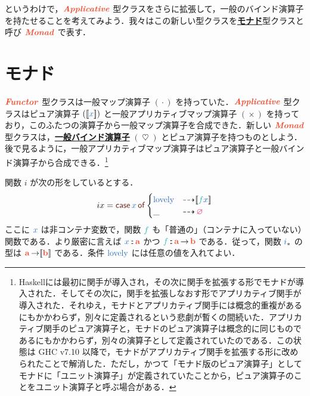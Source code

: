 \documentclass[a5paper,twoside,fleqn,draft]{jsbook}
\def\[{[\![}
\def\]{]\!]}
\def\constantColor{WildStrawberry}
\def\keywordColor{Sepia}
\def\varColor{NavyBlue}
\def\funcColor{BlueGreen}
\def\typeColor{RedOrange}
\newcommand{\programminglanguage}[1]{\textsf{#1}}
\newcommand{\haskell}{\programminglanguage{Haskell}}
\newcommand{\keyword}[1]{{\underline{\textbf{#1}}}}
\newcommand{\mKeyword}[1]{\textcolor{\keywordColor}{\mathsf{#1}}}
\newcommand{\mCaseKeyword}{\mKeyword{case}}
\newcommand{\mOfKeyword}{\mKeyword{of}}
\DeclareMathOperator{\mCaseKW}{\mCaseKeyword}
\DeclareMathOperator{\mOfKW}{\mOfKeyword}
\newcommand{\mPureNothing}{\textcolor{\constantColor}{\varnothing}}
\newcommand{\mVar}[1]{\textcolor{\varColor}{#1}}
\newcommand{\mSpecialVar}[1]{\textcolor{\varColor}{\textrm{#1}}}
\newcommand{\mLovelyVar}{\mSpecialVar{lovely}}
\newcommand{\mXVar}{\mVar{x}}
\newcommand{\mFunc}[1]{\textcolor{\funcColor}{#1}}
\newcommand{\mFFunc}{{\mFunc{f}}}
\DeclareMathOperator{\mAppMap}{\times}
\DeclareMathOperator{\mBind}{\heartsuit}
\DeclareMathOperator{\mBindMaybe}{\spadesuit}
\DeclareMathOperator{\mFuncArrow}{\rightarrow}
\DeclareMathOperator{\mIfSo}{\dashrightarrow}
\DeclareMathOperator{\mIn}{{:\!:}}
\DeclareMathOperator{\mMap}{\cdot}
\newcommand{\mType}[1]{\textcolor{\typeColor}{\mathbf{#1}}}
\newcommand{\mA}{\mType{a}}
\newcommand{\mB}{\mType{b}}
\newcommand{\mPureType}[1]{\[\mType{#1}\]}
\newcommand{\mPureWith}[1]{\[\mVar{#1}\]}
\newcommand{\mTypeClass}[1]{\textcolor{\typeColor}{\textbf{\textit{#1}}}}
\newcommand{\mApplicativeTypeClass}{\mTypeClass{Applicative}}
\newcommand{\mFunctorTypeClass}{\mTypeClass{Functor}}
\newcommand{\mMonadTypeClass}{\mTypeClass{Monad}}
\newcommand{\mMaybe}[1]{\mVar{#1}_?}
\newcommand{\mVarContainer}[1]{\mVar{#1}_*}
\newcommand{\mCaseOf}[1]{\mCaseKW#1\mOfKW}
\begin{document}

というわけで，$\mApplicativeTypeClass$ 型クラスをさらに拡張して，一般のバインド演算子を持たせることを考えてみよう．我々はこの新しい型クラスを\keyword{モナド}型クラスと呼び $\mMonadTypeClass$ で表す．

\section{モナド}

$\mFunctorTypeClass$ 型クラスは一般マップ演算子 $(\mMap)$ を持っていた．$\mApplicativeTypeClass$ 型クラスはピュア演算子 $(\mPureWith{x})$ と一般アプリカティブマップ演算子 $(\mAppMap)$ を持っており，このふたつの演算子から一般マップ演算子を合成できた．新しい $\mMonadTypeClass$ 型クラスは，\keyword{一般バインド演算子} $(\mBind)$ とピュア演算子を持つものとしよう．後で見るように，一般アプリカティブマップ演算子はピュア演算子と一般バインド演算子から合成できる．\footnote{\haskell には最初に関手が導入され，その次に関手を拡張する形でモナドが導入された．そしてその次に，関手を拡張しなおす形でアプリカティブ関手が導入された．それゆえ，モナドとアプリカティブ関手には概念的重複があるにもかかわらず，別々に定義されるという悲劇が暫くの間続いた．アプリカティブ関手のピュア演算子と，モナドのピュア演算子は概念的に同じものであるにもかかわらず，別々の演算子として定義されていたのである．この状態は GHC v7.10 以降で，モナドがアプリカティブ関手を拡張する形に改められたことで解消した．ただし，かつて「モナド版のピュア演算子」としてモナドに「ユニット演算子」が定義されていたことから，ピュア演算子のことをユニット演算子と呼ぶ場合がある．}

関数 $i$ が次の形をしているとする．
\begin{equation}
  \label{eq:def-of-i}
  ix=\mCaseOf{\mXVar}\begin{cases}
    \mLovelyVar
    &\mIfSo\mPureWith{\mFFunc\mXVar}\\
    \_
    &\mIfSo\mPureNothing
  \end{cases}
\end{equation}
ここに $\mXVar$ は非コンテナ変数で，関数 $\mFFunc$ も「普通の」（コンテナに入っていない）関数である．より厳密に言えば $\mXVar\mIn\mA$ かつ $\mFFunc\mIn\mA\mFuncArrow\mB$ である．従って，関数 $\mVarContainer{i}$ の型は $\mA\mFuncArrow\mPureType{b}$ である．条件 $\mLovelyVar$ には任意の値を入れてよい．
\end{document}
